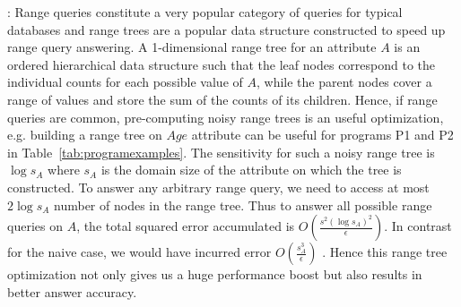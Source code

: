 \begin{comment}
For answering queries of the form $\phi=A_1==v_1\wedge \ldots  \wedge A_n==v_n$, ideally we just need to compute for $A_2==v_2\wedge \ldots \wedge A_n==v_n$ on $ct_{A,v}$ number of records starting from position $\sum_{i=1}^{i=v-1}ct_{A,i}$ of $\boldsymbol{\mathcal{\tilde{D}}}_{sort}$. 

However the \textsf{AS} has access only to the noisy CDF over the $k$ bins $ct_{A,i}$. Note that when $\bar{i}_{start}=\bar{\hat{\mathcal{C}}}[v-1] < \sum_{i=1}^{i=v-1}ct_{A,i}$ and $\bar{i}_{end}= \bar{\hat{\mathcal{C}}}[v-1] > i_{start}+ct_{A,v}$, i.e., the indices computed from the noisy values  saddle over the true records satisfying $A==v$, then although we end up loosing in performance a bit, we are still guaranteed to compute the exact non-noisy count for records satisfying $\phi$. 

In all other cases, we end up disregarding some of the records that satisfy $A==v$, some of these rejected records in fact might additionally satisfy $A_1==v_1 \wedge \ldots \wedge A_n==v_n$. Thus we might get inaccurate answer for query predicate $\phi$ (note that here we are talking about the encrypted true count of the given query predicate that is computed by the AS via a series of transformations before applying the LaplaceMechanism primitive).  An effective heuristic to tackle this can be to compensate for the expected laplacian error as follows  $\bar{i}_{start}= \bar{\hat{\mathcal{C}}}[v-1]-\frac{2}{\epsilon}$ and $\bar{i}_{end}=\bar{\hat{\mathcal{C}}}[v]+\frac{2}{\epsilon}$. Also note that answering differentially private  range queries   on attribute $A$ can also be directly done from the noisy CDF $\bar{\hat{\mathcal{C}}}$ 
\end{comment}



 
:
Range queries constitute a very popular category of queries for typical databases and range trees are a popular data structure constructed to speed up range query answering. 
A 1-dimensional range tree for an attribute $A$ is an ordered hierarchical data structure such that the leaf nodes correspond to the individual counts for each possible value of $A$, while the parent nodes cover a range of values and store the sum of the counts of its children. Hence, if range queries are common, pre-computing noisy range trees is an useful optimization, e.g. building a range tree on $Age$ attribute can be useful for programs P1 and P2 in Table~\ref{tab:programexamples}. The sensitivity for  such a noisy range tree is $\log s_A$ where $s_A$ is the domain size of the attribute on which the tree is constructed. To answer any arbitrary range query, we need to access at most $2\log s_A$ number of nodes in the range tree. Thus to answer all possible range queries on $A$, the total squared error accumulated is $O(\frac{s^2(\log s_A)^2 }{\epsilon})$. In contrast for the naive case, we would have incurred error $O(\frac{s_A^3}{\epsilon})$ \cite{cdf}. Hence this range tree optimization not only gives us a huge performance boost but also results in better answer accuracy.


